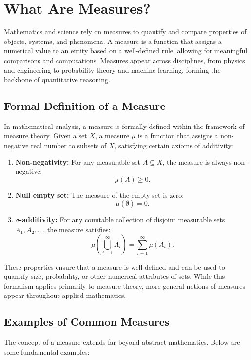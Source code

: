 \section{What Are Measures?}

Mathematics and science rely on measures to quantify and compare properties of objects, systems, and phenomena. A measure is a function that assigns a numerical value to an entity based on a well-defined rule, allowing for meaningful comparisons and computations. Measures appear across disciplines, from physics and engineering to probability theory and machine learning, forming the backbone of quantitative reasoning.

\subsection{Formal Definition of a Measure}

In mathematical analysis, a measure is formally defined within the framework of measure theory. Given a set \( X \), a measure \( \mu \) is a function that assigns a non-negative real number to subsets of \( X \), satisfying certain axioms of additivity:

\begin{enumerate}
    \item \textbf{Non-negativity:} For any measurable set \( A \subseteq X \), the measure is always non-negative:
    \[
    \mu(A) \geq 0.
    \]
    \item \textbf{Null empty set:} The measure of the empty set is zero:
    \[
    \mu(\emptyset) = 0.
    \]
    \item \textbf{\(\sigma\)-additivity:} For any countable collection of disjoint measurable sets \( A_1, A_2, \dots \), the measure satisfies:
    \[
    \mu\left(\bigcup_{i=1}^{\infty} A_i\right) = \sum_{i=1}^{\infty} \mu(A_i).
    \]
\end{enumerate}

These properties ensure that a measure is well-defined and can be used to quantify size, probability, or other numerical attributes of sets. While this formalism applies primarily to measure theory, more general notions of measures appear throughout applied mathematics.

\subsection{Examples of Common Measures}

The concept of a measure extends far beyond abstract mathematics. Below are some fundamental examples:

